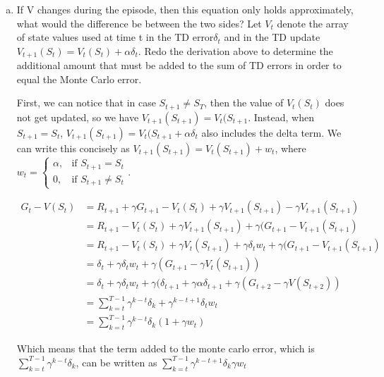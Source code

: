 \documentclass{exam}
\begin{document}
    \begin{enumerate}[(a)]
        \item If V changes during the episode, then this equation only holds approximately, what
would the difference be between the two sides? Let $V_t$ denote the array of state values
used at time t in the TD error$\delta_t$ and in the TD update $V_{t+1} (S_t ) = V_t (S_t ) + \alpha \delta_t $.
Redo the derivation above to determine the additional amount that must be added
to the sum of TD errors in order to equal the Monte Carlo error.
        
        \begin{solutionorlines}[2in]
First, we can notice that in case $S_{t+1} \neq S_T$, then the value of $V_t(S_t)$ does not get updated, so we have  $V_{t+1}(S_{t+1}) = V_{t}(S_{t+1}$. Instead, when $S_{t+1} = S_t$,  $V_{t+1}(S_{t+1}) = V_{t}(S_{t+1} + \alpha \delta_t$ also includes the delta term. We can write this concisely as $V_{t+1}(S_{t+1}) = V_{t}(S_{t+1}) + w_t$, where $w_t =  \begin{cases} \alpha , & \mbox{if }S_{t+1} = S_t \\ 0, & \mbox{if } S_{t+1} \neq S_t \end{cases}$. 

\begin{align*}
    G_t - V(S_t) &= R_{t+1} + \gamma G_{t+1} - V_t(S_t) + \gamma V_{t+1}(S_{t+1}) - \gamma V_{t+1}(S_{t+1}) \\
    &= R_{t+1}  - V_t(S_t) + \gamma V_{t+1}(S_{t+1}) + \gamma (G_{t+1} -  V_{t+1}(S_{t+1}) \\
    &= R_{t+1}  - V_t(S_t) + \gamma V_{t}(S_{t+1}) + \gamma \delta_t w_t + \gamma (G_{t+1} -  V_{t+1}(S_{t+1}) \\
    &= \delta_t + \gamma \delta_t w_t + \gamma ( G_{t+1} - \gamma V_t(S_{t+1} )) \\
    &= \delta_t + \gamma \delta_t w_t + \gamma ( \delta_{t+1} + \gamma \alpha \delta_{t+1} + \gamma ( G_{t+2} - \gamma V(S_{t+2} )) \\
    &= \sum_{k=t}^{T-1} \gamma^{k-t} \delta_k + \gamma^{k-t+1} \delta_t w_t\\
    &= \sum_{k=t}^{T-1} \gamma^{k-t} \delta_k (1 + \gamma w_t)
\end{align*}

Which means that the term added to the monte carlo error, which is $\sum_{k=t}^{T-1} \gamma^{k-t} \delta_k$, can be written as $\sum_{k=t}^{T-1} \gamma^{k-t+1} \delta_k \gamma w_t$
        \end{solutionorlines}
        

\end{enumerate}
\end{document}
